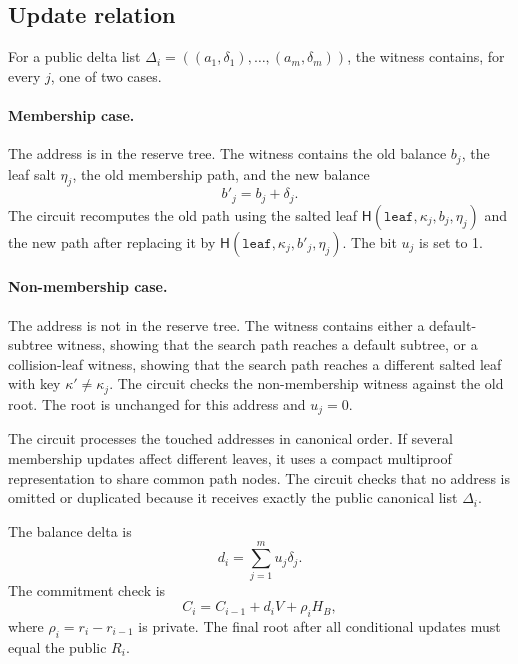 \documentclass[runningheads]{llncs}
\newcommand{\CRH}{\mathsf{H}}
\newcommand{\dlist}{\Delta}
\begin{document}
\subsection{Update relation}

For a public delta list \(\dlist_i=((a_1,\delta_1),\ldots,(a_m,\delta_m))\), the witness contains, for every \(j\), one of two cases.

\paragraph{Membership case.}
The address is in the reserve tree.  The witness contains the old balance \(b_j\), the leaf salt \(\eta_j\), the old membership path, and the new balance
\[
        b'_j=b_j+\delta_j.
\]
The circuit recomputes the old path using the salted leaf \(\CRH(\mathtt{leaf},\kappa_j,b_j,\eta_j)\) and the new path after replacing it by \(\CRH(\mathtt{leaf},\kappa_j,b'_j,\eta_j)\).  The bit \(u_j\) is set to 1.

\paragraph{Non-membership case.}
The address is not in the reserve tree.  The witness contains either a default-subtree witness, showing that the search path reaches a default subtree, or a collision-leaf witness, showing that the search path reaches a different salted leaf with key \(\kappa'\ne\kappa_j\).  The circuit checks the non-membership witness against the old root.  The root is unchanged for this address and \(u_j=0\).

The circuit processes the touched addresses in canonical order.  If several membership updates affect different leaves, it uses a compact multiproof representation to share common path nodes.  The circuit checks that no address is omitted or duplicated because it receives exactly the public canonical list \(\dlist_i\).

The balance delta is
\[
        d_i=\sum_{j=1}^m u_j\delta_j.
\]
The commitment check is
\[
        C_i=C_{i-1}+d_iV+\rho_iH_B,
\]
where \(\rho_i=r_i-r_{i-1}\) is private.  The final root after all conditional updates must equal the public \(R_i\).
\end{document}
